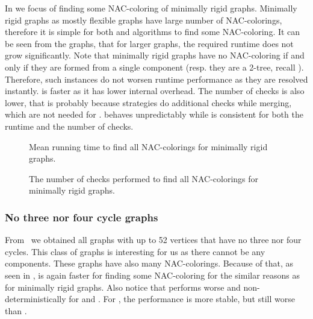 In 
we focus of finding some NAC-coloring of minimally rigid graphs.
%
Minimally rigid graphs as mostly flexible graphs have
large number of NAC-colorings, therefore it is simple for both \NaiveCycles{}
and \Subgraphs{} algorithms to find some NAC-coloring.
%
It can be seen from the graphs, that for larger graphs, the required runtime
does not grow significantly.
%
Note that minimally rigid graphs have no NAC-coloring if and only if they are formed from
a single \trcon{} component (resp. they are a 2-tree, recall ).
Therefore, such instances do not worsen runtime performance as they are resolved instantly.
%
\NaiveCycles{} is faster as it has lower internal overhead.
The number of \IsNACColoring{} checks is also lower,
that is probably because \Subgraphs{} strategies do additional checks
while merging, which are not needed for \NaiveCycles{}.
\SharedVertices{} behaves unpredictably while \MergeLinear{} is consistent
for both the runtime and the number of \IsNACColoring{} checks.

\begin{figure}[thbp]
	\centering
	\scalebox{\BenchFigureScale}{}
	\caption[Mean runtime for minimally rigid graphs (some).]{
		Mean running time to find all NAC-colorings for minimally rigid graphs.}%
	\label{fig:graph_minimally_rigid_first_runtime}
\end{figure}%
\begin{figure}[thbp]
	\centering
	\scalebox{\BenchFigureScale}{}
	\caption[Checks performed for minimally rigid graphs (some).]{
		The number of checks performed to find all NAC-colorings for minimally rigid graphs.}%
	\label{fig:graph_minimally_rigid_first_checks}
\end{figure}%



\subsubsection*{No three nor four cycle graphs}

From~\cite{extremal_graphs} we obtained all graphs with up to 52 vertices
that have no three nor four cycles. This class of graphs is interesting for us
as there cannot be any \trcon{} components.
These graphs have also many NAC-colorings.
Because of that, as seen in ,
\NaiveCycles{} is again faster for finding some NAC-coloring
for the similar reasons as for minimally rigid graphs.
%
Also notice that \SharedVertices{} performs worse and non-deterministically
for \CyclesMatchChunks{} and \None{}.
For \Neighbors{}, the performance is more stable, but still worse than \MergeLinear{}.


